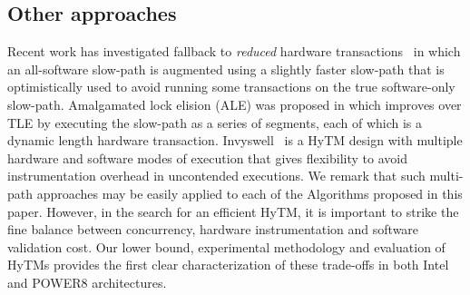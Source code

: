 \subsection{Other approaches}
Recent work has investigated fallback to \emph{reduced} hardware transactions~\cite{MS13}
in which an all-software slow-path is augmented using a slightly faster slow-path 
that is optimistically used to avoid running some transactions on the true software-only slow-path.
Amalgamated lock elision (ALE) was proposed in \cite{ale15} which improves over TLE
by executing the slow-path as a series of segments, each of which is a dynamic length hardware transaction.
Invyswell~\cite{Calciu14} is a HyTM design with multiple hardware and software modes of execution that gives flexibility to avoid instrumentation overhead in uncontended executions.
We remark that such multi-path approaches may be easily applied to each of the Algorithms proposed in this paper. However, 
in the search for an efficient HyTM, it is important to strike the fine balance between concurrency, hardware instrumentation and software validation cost.
Our lower bound, experimental methodology and evaluation of HyTMs provides the first clear characterization of these trade-offs in both Intel and POWER8 architectures. 
%